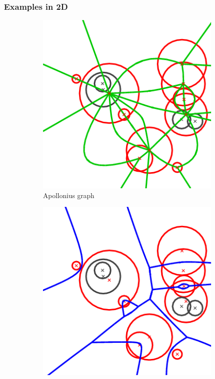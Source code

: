 \documentclass{beamer}
\begin{document}
\begin{frame}
    \frametitle{Examples in 2D}
    \begin{figure}[htp]
            \centering
            \begin{subfigure}[b]{0.48\textwidth}
                    \centering
                    \includegraphics[width=\textwidth]{../final-report/images/apollonius-graph.png}
                    \caption{Apollonius graph}
                    \label{fig:apo-graph}
            \end{subfigure}
            \begin{subfigure}[b]{0.48\textwidth}
                    \centering
                    \includegraphics[width=\textwidth]{../final-report/images/apollonius-diagram.png}

\end{subfigure}
\end{figure}
\end{frame}
\end{document}

